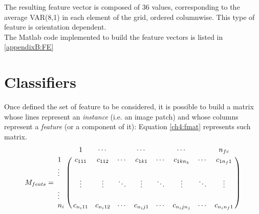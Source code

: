 The resulting feature vector is composed of 36 values, corresponding to the average VAR(8,1) in each element of the grid, ordered columnwise. This type of feature is orientation dependent.
\\
The Matlab code implemented to build the feature vectors is listed in \ref{appendixB:FE}






\vspace{0.5cm}


\section{Classifiers}

Once defined the set of feature to be considered, it is possible to build a matrix whose lines represent an \textit{instance} (i.e. an image patch) and whose columns represent a \textit{feature}
(or a component of it): Equation \ref{ch4:fmat} represents such matrix.
\begin{equation}
\label{ch4:fmat}
 M_{feats} = \\ \bordermatrix{~ & \tikzmark{harrowleft} 1 & \cdots & ~  & \cdots & ~ & \cdots & ~ & n_{fc}\tikzmark{harrowright}  \cr
			      \tikzmark{varrowtop} 1 & c_{111} & c_{112} & \cdots & c_{1k1} & \cdots & c_{1kn_k} & \cdots & c_{1n_f1} \cr
			                      \vdots &    ~    &   ~     &   ~    &    ~    &   ~    &     ~     &    ~   &     ~     \cr
			                       ~     & \vdots  & \vdots  & \ddots & \vdots  & \ddots & \vdots    & \ddots &  \vdots   \cr
			                      \vdots &    ~    &   ~     &   ~    &   ~     &   ~    &    ~      &    ~   &    ~      \cr
			      \tikzmark{varrowbottom} n_i & \tikzmark{f1} c_{n_i11} & c_{n_i12} \tikzmark{f2} & \cdots & \tikzmark{f3} c_{n_ij1} & \cdots & c_{n_ijn_j} \tikzmark{f4} & \cdots & \tikzmark{f5} c_{n_in_f1} \tikzmark{f6} \cr
			     }
\end{equation}


